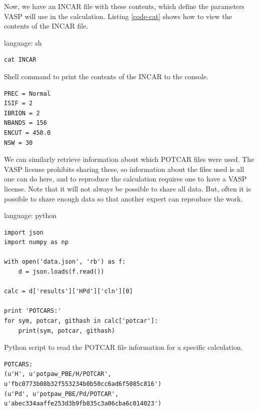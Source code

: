 \documentclass[journal=accacs,manuscript=article,email=true]{achemso}
\begin{document}
Now, we have an INCAR file with these contents, which define the parameters VASP will use in the calculation. Listing \ref{code-cat} shows how to view the contents of the INCAR file.

\begin{tcolorbox}
language: sh\begin{listing}[H]
\begin{verbatim}
cat INCAR
\end{verbatim}
\caption{Shell command to print the contents of the INCAR to the console. \label{code-cat}}
\end{listing}
\end{tcolorbox}

\begin{verbatim}
PREC = Normal
ISIF = 2
IBRION = 2
NBANDS = 156
ENCUT = 450.0
NSW = 30
\end{verbatim}

We can similarly retrieve information about which POTCAR files were used. The VASP license prohibits sharing these, so information about the files used is all one can do here, and to reproduce the calculation requires one to have a VASP license. Note that it will not always be possible to share all data. But, often it is possible to share enough data so that another expert can reproduce the work.

\begin{tcolorbox}
language: python\begin{listing}[H]
\begin{verbatim}
import json
import numpy as np

with open('data.json', 'rb') as f:
    d = json.loads(f.read())

calc = d['results']['HPd']['cln'][0]

print 'POTCARS:'
for sym, potcar, githash in calc['potcar']:
    print(sym, potcar, githash)
\end{verbatim}
\caption{Python script to read the POTCAR file information for a specific calculation.}
\end{listing}
\end{tcolorbox}

\begin{verbatim}
POTCARS:
(u'H', u'potpaw_PBE/H/POTCAR', u'fbc0773b08b32f553234b0b50cc6ad6f5085c816')
(u'Pd', u'potpaw_PBE/Pd/POTCAR', u'abec334aaffe253d3b9fb835c3a06cba6c014023')
\end{verbatim}
\end{document}
